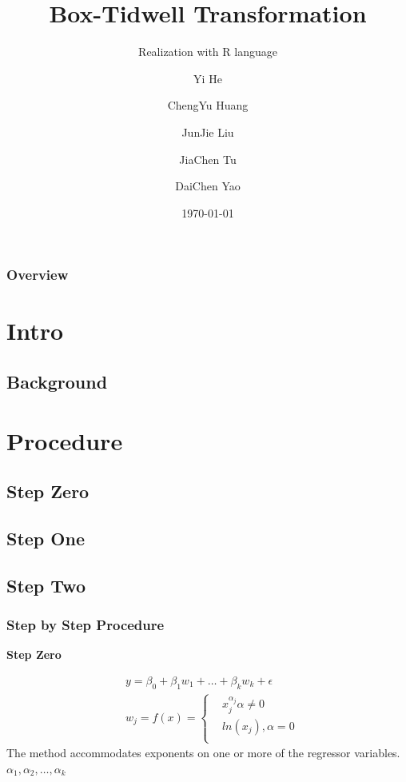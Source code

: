 \documentclass[10pt,aspectratio=32]{beamer}
\title{Box-Tidwell Transformation}
\subtitle{Realization with R language}
\author{Yi He \and ChengYu Huang \and JunJie Liu \\ \and JiaChen Tu \and DaiChen Yao }
\institute{United International College - STAT}
\date{\today}
\begin{document}
\AtBeginSection[]{\frame{\sectionpage}} %

\begin{frame}
	\titlepage
\end{frame}

\begin{frame}
	\frametitle{Overview}
	\vspace{-0.7cm}
	\tableofcontents
\end{frame}

\section{Intro}
\subsection{Background}

\section{Procedure}
\subsection{Step Zero}
\subsection{Step One}
\subsection{Step Two}

\begin{frame}
\frametitle{Step by Step Procedure}
\vspace{-0.3cm}

\textbf{Step Zero}

$$\begin{align}
&y = \beta_0 + \beta_1 w_1 + \dots + \beta_k w_k + \epsilon \label{eq:ordinary linear regression} \\
&w_j = f(x) =\left\{
\begin{aligned}
&x_j^{\alpha_j}  \alpha \neq 0 \\
&ln(x_j), \alpha = 0 \label{eq:ransformation of X}\\
\end{aligned}
\right.
\end{align}
$$
The method accommodates exponents on one or more of the regressor variables. $\alpha_1, \alpha_2, \dots,\alpha_k$
\end{frame}
\end{document}
